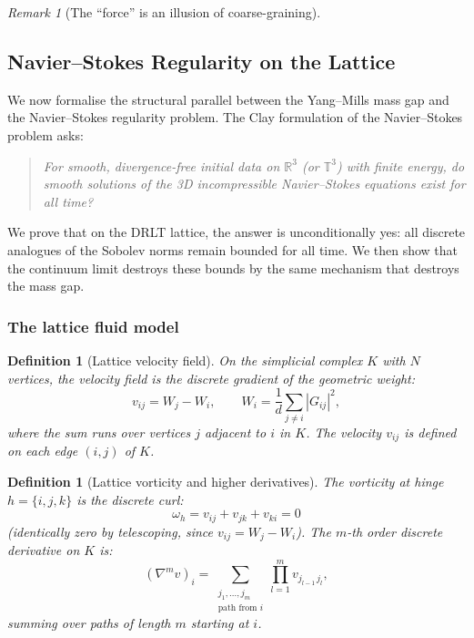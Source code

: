 \documentclass[12pt]{article}
\newtheorem{definition}[theorem]{Definition}
\theoremstyle{remark}
\newtheorem{remark}[theorem]{Remark}
\theoremstyle{definition}
\newcommand{\RR}{\mathbb{R}}
\begin{document}
\begin{remark}[The ``force'' is an illusion of coarse-graining]
\subsection{Navier--Stokes Regularity on the Lattice}
\label{sec:navier_stokes}

We now formalise the structural parallel between the Yang--Mills mass
gap and the Navier--Stokes regularity problem.  The Clay formulation
of the Navier--Stokes problem \cite{Clay} asks:

\begin{quote}
\emph{For smooth, divergence-free initial data on $\RR^3$ (or
$\mathbb{T}^3$) with finite energy, do smooth solutions of the
3D incompressible Navier--Stokes equations exist for all time?}
\end{quote}

\noindent
We prove that on the DRLT lattice, the answer is unconditionally yes:
all discrete analogues of the Sobolev norms remain bounded for all time.
We then show that the continuum limit destroys these bounds by the same
mechanism that destroys the mass gap.

\subsubsection{The lattice fluid model}

\begin{definition}[Lattice velocity field]
\label{def:lattice_velocity}
On the simplicial complex $K$ with $N$ vertices, the
\emph{velocity field} is the discrete gradient of the geometric weight:
\begin{equation}
v_{ij} = W_j - W_i, \qquad
W_i = \frac{1}{d} \sum_{j \neq i} |G_{ij}|^2,
\end{equation}
where the sum runs over vertices $j$ adjacent to $i$ in $K$.  The
velocity $v_{ij}$ is defined on each edge $(i,j)$ of $K$.
\end{definition}

\begin{definition}[Lattice vorticity and higher derivatives]
\label{def:lattice_vorticity}
The \emph{vorticity} at hinge $h = \{i, j, k\}$ is the discrete curl:
\begin{equation}
\omega_h = v_{ij} + v_{jk} + v_{ki} = 0
\end{equation}
(identically zero by telescoping, since $v_{ij} = W_j - W_i$).
The $m$-th order \emph{discrete derivative} on $K$ is:
\begin{equation}
(\nabla^m v)_{i} = \sum_{\substack{j_1, \ldots, j_m \\ \text{path from } i}}
\prod_{l=1}^{m} v_{j_{l-1}\, j_l},
\end{equation}
summing over paths of length $m$ starting at $i$.
\end{definition}


\end{remark}
\end{document}
